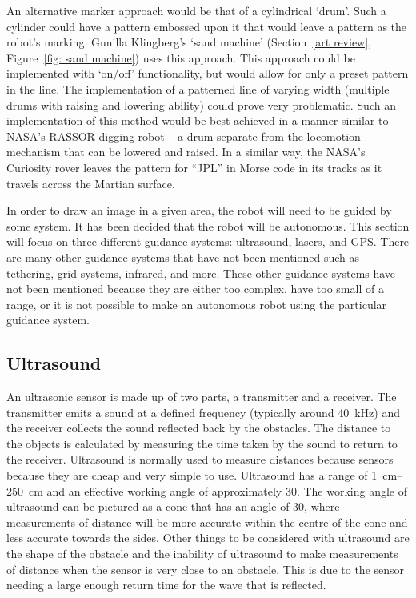     An alternative marker approach would be that of a cylindrical `drum'. Such a cylinder could have a pattern embossed upon it that would leave a pattern as the robot's marking. Gunilla Klingberg's `sand machine' (Section~\ref{art review}, Figure~\ref{fig: sand machine}) uses this approach. This approach could be implemented with `on/off' functionality, but would allow for only a preset pattern in the line. The implementation of a patterned line of varying width (\eg multiple drums with raising and lowering ability) could prove very problematic. Such an implementation of this method would be best achieved in a manner similar to NASA's RASSOR digging robot -- a drum separate from the locomotion mechanism that can be lowered and raised.\cite{Siceloff2013} In a similar way, the NASA's Curiosity rover leaves the pattern for ``JPL'' in Morse code in its tracks as it travels across the Martian surface.




    In order to draw an image in a given area, the robot will need to be guided by some system.
    It has been decided that the robot will be autonomous. This section will focus on three different guidance systems: ultrasound, lasers, and GPS. There are many other guidance systems that have not been mentioned such as tethering, grid systems, infrared, and more. These other guidance systems have not been mentioned because they are either too complex, have too small of a range, or it is not possible to make an autonomous robot using the particular guidance system.

    \subsection{Ultrasound}
        An ultrasonic sensor is made up of two parts, a transmitter and a receiver. The transmitter emits a sound at a defined frequency (typically around \SI{40}{\kilo\hertz}) and the receiver collects the sound reflected back by the obstacles. The distance to the objects is calculated by measuring the time taken by the sound to return to the receiver.
        Ultrasound is normally used to measure distances because sensors because they are cheap and very simple to use. Ultrasound has a range of \SIrange{1}{250}{\centi\meter} and an effective working angle of approximately 30\dg.\cite{ultrasoundrobots} The working angle of ultrasound can be pictured as a cone that has an angle of 30\dg, where measurements of distance will be more accurate within the centre of the cone and less accurate towards the sides. Other things to be considered with ultrasound are the shape of the obstacle and the inability of ultrasound to make measurements of distance when the sensor is very close to an obstacle. This is due to the sensor needing a large enough return time for the wave that is reflected.

